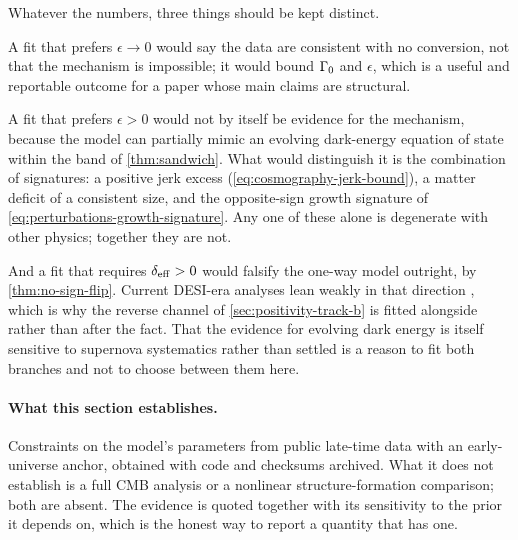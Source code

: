 Whatever the numbers, three things should be kept distinct.

A fit that prefers $\epsilon\to0$ would say the data are consistent with no
conversion, not that the mechanism is impossible; it would bound $\Gamma_{0}$ and
$\epsilon$, which is a useful and reportable outcome for a paper whose main
claims are structural.

A fit that prefers $\epsilon>0$ would not by itself be evidence for the
mechanism, because the model can partially mimic an evolving dark-energy
equation of state within the band of \cref{thm:sandwich}. What would
distinguish it is the combination of signatures: a positive jerk excess
(\cref{eq:cosmography-jerk-bound}), a matter deficit of a consistent size, and the opposite-sign growth signature of
\cref{eq:perturbations-growth-signature}. Any one of these alone is degenerate
with other physics; together they are not.

And a fit that requires $\delta_{\rm eff}>0$ would falsify the one-way model
outright, by \cref{thm:no-sign-flip}. Current DESI-era analyses lean weakly in
that direction \parencite{kandel2026_260712283,yang2026_260821938}, which is why
the reverse channel of \cref{sec:positivity-track-b} is fitted alongside rather
than after the fact. That the evidence for evolving dark energy is itself
sensitive to supernova systematics rather than settled
\parencite{popovic2025_251107517} is a reason to fit both branches and not to
choose between them here.

\paragraph{What this section establishes.}
Constraints on the model's parameters from public late-time data with an
early-universe anchor, obtained with code and checksums archived. What it does
not establish is a full CMB analysis or a nonlinear structure-formation
comparison; both are absent. The evidence is quoted together with its
sensitivity to the prior it depends on, which is the honest way to report a
quantity that has one.

